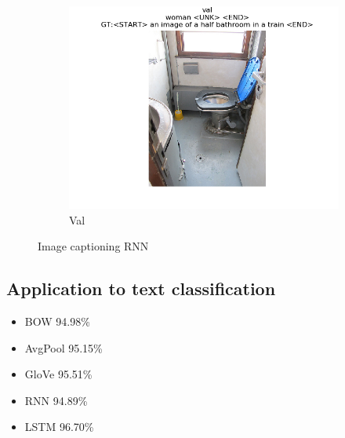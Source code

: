 \documentclass[12pt]{article}
\begin{document}
\begin{figure}[htbp]
\begin{subfigure}[t]{0.48\textwidth}
        \includegraphics[trim={3in 0in 3in 0in},scale=0.5]{./Homework2/output/hw2p5_fig10.png}
        \caption{Val}
    \label{hw2p5j}
    \end{subfigure}
    \caption{Image captioning RNN}
\end{figure}

\newpage
\subsection{Application to text classification}
\begin{itemize}
    \item{BOW} 94.98\%
    \item{AvgPool} 95.15\%
    \item{GloVe} 95.51\%
    \item{RNN} 94.89\%
    \item{LSTM} 96.70\%
\end{itemize}
\inputminted[frame=single,framesep=10pt,linenos, breaklines,xleftmargin=\parindent,xrightmargin=\parindent]{python}{./Homework2/output/hw2p6.txt}
\end{document}
